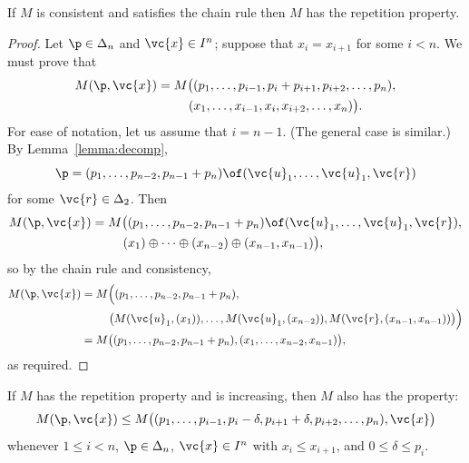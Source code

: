 \begin{lemma}
If $M$ is consistent and satisfies the chain rule then $M$ has the
repetition property.   
\end{lemma}

\begin{proof}
Let $\p \in \Delta_n$ and $\vc{x} \in I^n$; suppose that $x_i =
x_{i + 1}$ for some $i < n$.  We must prove that
% 
\begin{align*}
M(\p, \vc{x}) &
=
M\bigl(
(p_1, \ldots, p_{i - 1}, p_i + p_{i + 1}, p_{i + 2}, \ldots, p_n),      \\
&
\hspace*{2.5em}
(x_1, \ldots, x_{i - 1}, x_i, x_{i + 2}, \ldots, x_n)
\bigr).
\end{align*}
% 
For ease of notation, let us assume that $i = n - 1$.  (The general case is
similar.)  By Lemma~\ref{lemma:decomp},
\[
\p = 
(p_1, \ldots, p_{n - 2}, p_{n - 1} + p_n) \of
(\vc{u}_1, \ldots, \vc{u}_1, \vc{r})
\]
for some $\vc{r} \in \Delta_2$.  Then 
% 
\begin{align*}
M(\p, \vc{x})
&
=
M \bigl(
(p_1, \ldots, p_{n - 2}, p_{n - 1} + p_n) \of
(\vc{u}_1, \ldots, \vc{u}_1, \vc{r}),   \\
&
\hspace*{2.5em}
(x_1) \oplus\cdots\oplus (x_{n - 2}) \oplus (x_{n - 1}, x_{n - 1})
\bigr),
\end{align*}
% 
so by the chain rule and consistency,
% 
\begin{align*}
M(\p, \vc{x})   &
=
M \Bigl(
(p_1, \ldots, p_{n - 2}, p_{n - 1} + p_n),      \\
&
\hspace*{2.5em}
\bigl( 
M(\vc{u}_1, (x_1)), \ldots, M(\vc{u}_1, (x_{n - 2})), 
M(\vc{r}, (x_{n - 1}, x_{n - 1}))
\bigr)
\Bigr)  \\
&
=
M \bigl(
(p_1, \ldots, p_{n - 2}, p_{n - 1} + p_n),
(x_1, \ldots, x_{n - 2}, x_{n - 1})
\bigr),
\end{align*}
% 
as required.
\end{proof}

\begin{lemma}
If $M$ has the repetition property and is increasing, then $M$ also has the
%
%
% 
property:
\[
M(\p, \vc{x})
\leq
M \bigl( 
(p_1, \ldots, p_{i - 1}, 
p_i - \delta, p_{i + 1} + \delta, 
p_{i + 2}, \ldots, p_n),
\vc{x}
\bigr)
\]
whenever $1 \leq i < n$, $\p \in \Delta_n$, $\vc{x} \in I^n$ with $x_i
  \leq x_{i + 1}$, and $0 \leq \delta \leq p_i$.
\end{lemma}

